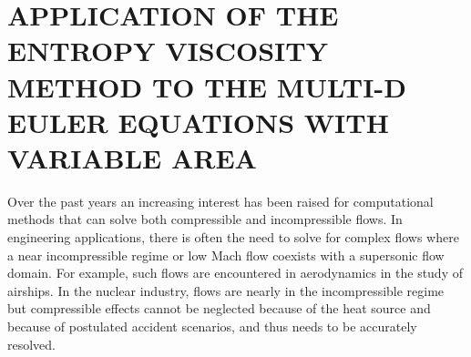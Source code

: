 %
%
%


\chapter{\uppercase {Application of the entropy viscosity method to the multi-D Euler equations with variable area}}\label{chap:euler}
Over the past years an increasing interest has been raised for computational methods that can solve both compressible and incompressible flows. In engineering applications, there is often the need to solve for complex flows where a near incompressible regime or low Mach flow coexists with a supersonic flow domain. For example, such flows are encountered in aerodynamics in the study of airships. In the nuclear industry, flows are nearly in the incompressible regime but compressible effects cannot be neglected because of the heat source and because of postulated accident scenarios, and thus needs to be accurately resolved. \\

